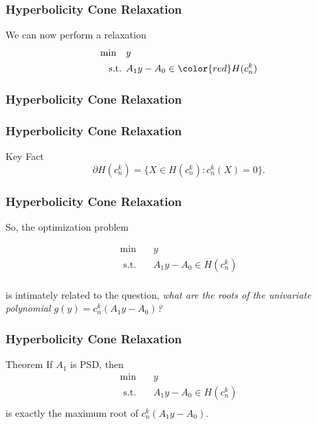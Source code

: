 \documentclass{beamer}
\newcommand{\st}{{\text{ s.t. }}}
\begin{document}
\begin{frame}
    \frametitle{Hyperbolicity Cone Relaxation}
    We can now perform a relaxation
        \begin{equation}
            \begin{aligned}
                \min\quad & y\\
                \st & A_1y - A_0 \in {\color{red} H(c_n^k)}\\
            \end{aligned}
        \end{equation}
    \pause
\end{frame}
\begin{frame}
    \frametitle{Hyperbolicity Cone Relaxation}
\end{frame}
\begin{frame}
    \frametitle{Hyperbolicity Cone Relaxation}
    \begin{block}{Key Fact}
        \[\partial H(c_n^k) = \{X \in H(c_n^k) : c_n^k(X) = 0\}.\]
    \end{block}
\end{frame}
\begin{frame}
    \frametitle{Hyperbolicity Cone Relaxation}
    So, the optimization problem 

    \begin{equation}
        \begin{aligned}
            \min\quad & y\\
            \st & A_1y - A_0 \in H(c_n^k)\\
        \end{aligned}
    \end{equation}

    is intimately related to the question, \emph{what are the roots of the univariate polynomial $g(y) = c_n^k(A_1y-A_0)$?}
\end{frame}
\begin{frame}
    \frametitle{Hyperbolicity Cone Relaxation}
    \begin{block}{Theorem}
        If $A_1$ is PSD, then 
        \begin{equation}
            \begin{aligned}
                \min\quad & y\\
                \st & A_1y - A_0 \in H(c_n^k)\\
            \end{aligned}
        \end{equation}
        is exactly the maximum root of $c_n^k(A_1y-A_0)$.
    \end{block}
\end{frame}
\end{document}
